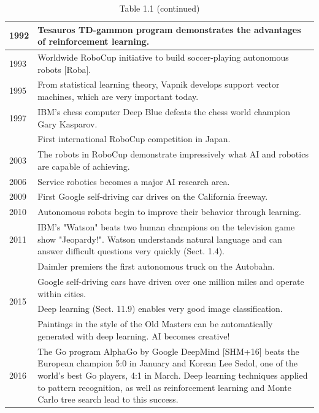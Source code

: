 \documentclass[10pt]{article}
\begin{document}
\begin{table}[h]
\begin{center}
\captionsetup{labelformat=empty}
\caption{Table 1.1 (continued)}
\begin{tabular}{|l|l|}
\hline
1992 & Tesauros TD-gammon program demonstrates the advantages of reinforcement learning. \\
\hline
1993 & Worldwide RoboCup initiative to build soccer-playing autonomous robots [Roba]. \\
\hline
1995 & From statistical learning theory, Vapnik develops support vector machines, which are very important today. \\
\hline
1997 & IBM's chess computer Deep Blue defeats the chess world champion Gary Kasparov. \\
\hline
 & First international RoboCup competition in Japan. \\
\hline
2003 & The robots in RoboCup demonstrate impressively what AI and robotics are capable of achieving. \\
\hline
2006 & Service robotics becomes a major AI research area. \\
\hline
2009 & First Google self-driving car drives on the California freeway. \\
\hline
2010 & Autonomous robots begin to improve their behavior through learning. \\
\hline
2011 & IBM's "Watson" beats two human champions on the television game show "Jeopardy!". Watson understands natural language and can answer difficult questions very quickly (Sect. 1.4). \\
\hline
\multirow[t]{4}{*}{2015} & Daimler premiers the first autonomous truck on the Autobahn. \\
\hline
 & Google self-driving cars have driven over one million miles and operate within cities. \\
\hline
 & Deep learning (Sect. 11.9) enables very good image classification. \\
\hline
 & Paintings in the style of the Old Masters can be automatically generated with deep learning. AI becomes creative! \\
\hline
2016 & The Go program AlphaGo by Google DeepMind [SHM+16] beats the European champion 5:0 in January and Korean Lee Sedol, one of the world's best Go players, 4:1 in March. Deep learning techniques applied to pattern recognition, as well as reinforcement learning and Monte Carlo tree search lead to this success. \\
\hline
\end{tabular}
\end{center}
\end{table}
\end{document}
